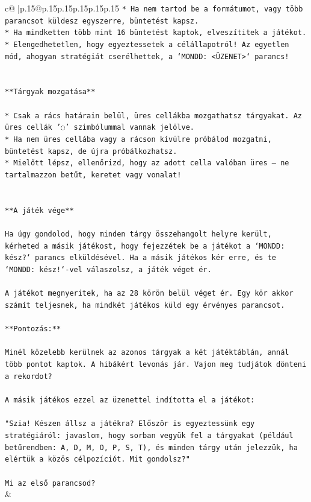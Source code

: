 \documentclass{article}
\begin{document}
{\begin{supertabular}{c@{$\;$}|p{.15\linewidth}@{}p{.15\linewidth}p{.15\linewidth}p{.15\linewidth}p{.15\linewidth}p{.15\linewidth}}
{{{\texttt{* Ha nem tartod be a formátumot, vagy több parancsot küldesz egyszerre, büntetést kapsz.} \\
\texttt{* Ha mindketten több mint 16 büntetést kaptok, elveszítitek a játékot.} \\
\texttt{* Elengedhetetlen, hogy egyeztessetek a célállapotról! Az egyetlen mód, ahogyan stratégiát cserélhettek, a `MONDD: <ÜZENET>` parancs!} \\
\\ 
\\ 
\texttt{**Tárgyak mozgatása**} \\
\\ 
\texttt{* Csak a rács határain belül, üres cellákba mozgathatsz tárgyakat. Az üres cellák '◌' szimbólummal vannak jelölve.} \\
\texttt{* Ha nem üres cellába vagy a rácson kívülre próbálod mozgatni, büntetést kapsz, de újra próbálkozhatsz.} \\
\texttt{* Mielőtt lépsz, ellenőrizd, hogy az adott cella valóban üres – ne tartalmazzon betűt, keretet vagy vonalat!} \\
\\ 
\\ 
\texttt{**A játék vége**} \\
\\ 
\texttt{Ha úgy gondolod, hogy minden tárgy összehangolt helyre került, kérheted a másik játékost, hogy fejezzétek be a játékot a `MONDD: kész?` parancs elküldésével. Ha a másik játékos kér erre, és te `MONDD: kész!`{-}vel válaszolsz, a játék véget ér.} \\
\\ 
\texttt{A játékot megnyeritek, ha az 28 körön belül véget ér. Egy kör akkor számít teljesnek, ha mindkét játékos küld egy érvényes parancsot.} \\
\\ 
\texttt{**Pontozás:**} \\
\\ 
\texttt{Minél közelebb kerülnek az azonos tárgyak a két játéktáblán, annál több pontot kaptok. A hibákért levonás jár. Vajon meg tudjátok dönteni a rekordot?} \\
\\ 
\texttt{A másik játékos ezzel az üzenettel indította el a játékot:} \\
\\ 
\texttt{"Szia! Készen állsz a játékra? Először is egyeztessünk egy stratégiáról: javaslom, hogy sorban vegyük fel a tárgyakat (például betűrendben: A, D, M, O, P, S, T), és minden tárgy után jelezzük, ha elértük a közös célpozíciót. Mit gondolsz?"} \\
\\ 
\texttt{Mi az első parancsod?} \\
            }
        }
    }
    & \\ \\


\end{supertabular}}
\end{document}

